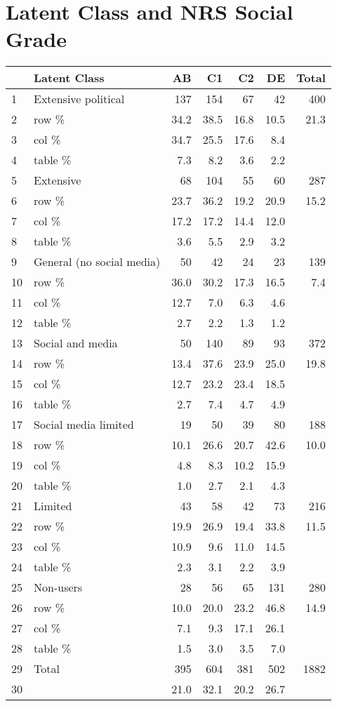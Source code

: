 \documentclass{article}
\begin{document}
\section{Latent Class and NRS Social Grade}

\begin{table}[ht]
\centering
\begin{tabular}{llrrrrr}
  \hline
 & Latent Class & AB & C1 & C2 & DE & Total \\ 
  \hline
1 & Extensive political & 137 & 154 & 67 & 42 & 400 \\ 
  2 & row \% & 34.2 & 38.5 & 16.8 & 10.5 & 21.3 \\ 
  3 & col \% & 34.7 & 25.5 & 17.6 & 8.4 &  \\ 
  4 & table \% & 7.3 & 8.2 & 3.6 & 2.2 &  \\ 
  5 & Extensive & 68 & 104 & 55 & 60 & 287 \\ 
  6 & row \% & 23.7 & 36.2 & 19.2 & 20.9 & 15.2 \\ 
  7 & col \% & 17.2 & 17.2 & 14.4 & 12.0 &  \\ 
  8 & table \% & 3.6 & 5.5 & 2.9 & 3.2 &  \\ 
  9 & General (no social media) & 50 & 42 & 24 & 23 & 139 \\ 
  10 & row \% & 36.0 & 30.2 & 17.3 & 16.5 & 7.4 \\ 
  11 & col \% & 12.7 & 7.0 & 6.3 & 4.6 &  \\ 
  12 & table \% & 2.7 & 2.2 & 1.3 & 1.2 &  \\ 
  13 & Social and media & 50 & 140 & 89 & 93 & 372 \\ 
  14 & row \% & 13.4 & 37.6 & 23.9 & 25.0 & 19.8 \\ 
  15 & col \% & 12.7 & 23.2 & 23.4 & 18.5 &  \\ 
  16 & table \% & 2.7 & 7.4 & 4.7 & 4.9 &  \\ 
  17 & Social media limited & 19 & 50 & 39 & 80 & 188 \\ 
  18 & row \% & 10.1 & 26.6 & 20.7 & 42.6 & 10.0 \\ 
  19 & col \% & 4.8 & 8.3 & 10.2 & 15.9 &  \\ 
  20 & table \% & 1.0 & 2.7 & 2.1 & 4.3 &  \\ 
  21 & Limited & 43 & 58 & 42 & 73 & 216 \\ 
  22 & row \% & 19.9 & 26.9 & 19.4 & 33.8 & 11.5 \\ 
  23 & col \% & 10.9 & 9.6 & 11.0 & 14.5 &  \\ 
  24 & table \% & 2.3 & 3.1 & 2.2 & 3.9 &  \\ 
  25 & Non-users & 28 & 56 & 65 & 131 & 280 \\ 
  26 & row \% & 10.0 & 20.0 & 23.2 & 46.8 & 14.9 \\ 
  27 & col \% & 7.1 & 9.3 & 17.1 & 26.1 &  \\ 
  28 & table \% & 1.5 & 3.0 & 3.5 & 7.0 &  \\ 
  29 & Total & 395 & 604 & 381 & 502 & 1882 \\ 
  30 &  & 21.0 & 32.1 & 20.2 & 26.7 &  \\ 
   \hline
\end{tabular}
\end{table}
\end{document}
